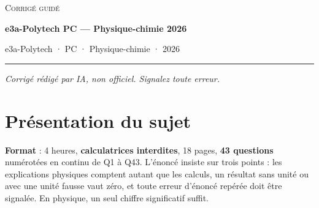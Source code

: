 \documentclass[11pt,a4paper]{article}
\begin{document}
\thispagestyle{plain}
\begin{center}
  {\small\scshape Corrigé guidé}\par\smallskip
  {\LARGE\bfseries e3a-Polytech PC — Physique-chimie 2026\par}\medskip
  {\large e3a-Polytech · PC · Physique-chimie · 2026\par}
\end{center}
\vspace{2pt}\hrule\vspace{8pt}

\emph{Corrigé rédigé par IA, non officiel. Signalez toute erreur.}

\hypertarget{pruxe9sentation-du-sujet}{%
\section{Présentation du sujet}\label{pruxe9sentation-du-sujet}}

\textbf{Format} : 4 heures, \textbf{calculatrices interdites}, 18 pages, \textbf{43 questions} numérotées en continu de Q1 à Q43. L'énoncé insiste sur trois points : les explications physiques comptent autant que les calculs, un résultat sans unité ou avec une unité fausse vaut zéro, et toute erreur d'énoncé repérée doit être signalée. En physique, un seul chiffre significatif suffit.
\end{document}
